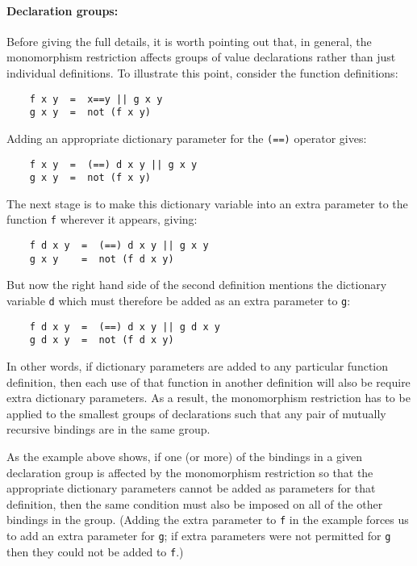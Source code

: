 \paragraph{Declaration groups:}
Before giving the full details, it  is  worth  pointing  out  that,  in
general,  the  monomorphism  restriction  affects   groups   of   value
declarations rather than just individual  definitions.   To  illustrate
this point, consider the function definitions:
\begin{verbatim}
    f x y  =  x==y || g x y
    g x y  =  not (f x y)
\end{verbatim}
Adding an appropriate dictionary parameter for the \verb"(==)" operator gives:
\begin{verbatim}
    f x y  =  (==) d x y || g x y
    g x y  =  not (f x y)
\end{verbatim}
The next stage is to  make  this  dictionary  variable  into  an  extra
parameter to the function \verb"f" wherever it appears, giving:
\begin{verbatim}
    f d x y  =  (==) d x y || g x y
    g x y    =  not (f d x y)
\end{verbatim}
But now the right hand side  of  the  second  definition  mentions  the
dictionary variable \verb"d"  which  must  therefore  be  added  as  an  extra
parameter to \verb"g":
\begin{verbatim}
    f d x y  =  (==) d x y || g d x y
    g d x y  =  not (f d x y)
\end{verbatim}
In other words, if dictionary parameters are added  to  any  particular
function  definition,  then  each  use  of  that  function  in  another
definition will also be require  extra  dictionary  parameters.   As  a
result, the monomorphism restriction has to be applied to the  smallest
groups of  declarations  such  that  any  pair  of  mutually  recursive
bindings are in the same group.

As the example above shows, if one (or more) of the bindings in a given
declaration group is affected by the monomorphism restriction  so  that
the appropriate dictionary parameters cannot be added as parameters for
that definition, then the same condition must also be imposed on all of
the other bindings in the group.  (Adding the extra parameter to  \verb"f"  in
the example forces us to  add  an  extra  parameter  for  \verb"g";  if  extra
parameters were not permitted for \verb"g" 
then they could not be added to \verb"f".)

